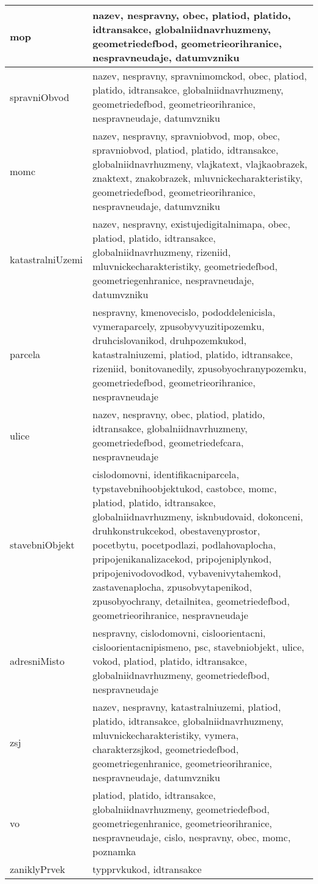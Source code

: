 \begin{center}
\begin{longtable}{|>{\raggedright\arraybackslash}p{4cm}|>{\raggedright\arraybackslash}p{9cm}|}
    \hline
    mop & nazev, nespravny, obec, platiod, platido, idtransakce, globalniidnavrhuzmeny, geometriedefbod, geometrieorihranice, nespravneudaje, datumvzniku \\
    \hline
    spravniObvod & nazev, nespravny, spravnimomckod, obec, platiod, platido, idtransakce, globalniidnavrhuzmeny, geometriedefbod, geometrieorihranice, nespravneudaje, datumvzniku \\
    \hline
    momc & nazev, nespravny, spravniobvod, mop, obec, spravniobvod, platiod, platido, idtransakce, globalniidnavrhuzmeny, vlajkatext, vlajkaobrazek, znaktext, znakobrazek, mluvnickecharakteristiky, geometriedefbod, geometrieorihranice, nespravneudaje, datumvzniku \\
    \hline
    katastralniUzemi & nazev, nespravny, existujedigitalnimapa, obec, platiod, platido, idtransakce, globalniidnavrhuzmeny, rizeniid, mluvnickecharakteristiky, geometriedefbod, geometriegenhranice, nespravneudaje, datumvzniku \\
    \hline
    parcela & nespravny, kmenovecislo, pododdelenicisla, vymeraparcely, zpusobyvyuzitipozemku, druhcislovanikod, druhpozemkukod, katastralniuzemi, platiod, platido, idtransakce, rizeniid, bonitovanedily, zpusobyochranypozemku, geometriedefbod, geometrieorihranice, nespravneudaje \\
    \hline
    ulice & nazev, nespravny, obec, platiod, platido, idtransakce, globalniidnavrhuzmeny, geometriedefbod, geometriedefcara, nespravneudaje \\
    \hline
    stavebniObjekt & cislodomovni, identifikacniparcela, typstavebnihoobjektukod, castobce, momc, platiod, platido, idtransakce, globalniidnavrhuzmeny, isknbudovaid, dokonceni, druhkonstrukcekod, obestavenyprostor, pocetbytu, pocetpodlazi, podlahovaplocha, pripojenikanalizacekod, pripojeniplynkod, pripojenivodovodkod, vybavenivytahemkod, zastavenaplocha, zpusobvytapenikod, zpusobyochrany, detailnitea, geometriedefbod, geometrieorihranice, nespravneudaje \\
    \hline
    adresniMisto & nespravny, cislodomovni, cisloorientacni, cisloorientacnipismeno, psc, stavebniobjekt, ulice, vokod, platiod, platido, idtransakce, globalniidnavrhuzmeny, geometriedefbod, nespravneudaje \\
    \hline
    zsj & nazev, nespravny, katastralniuzemi, platiod, platido, idtransakce, globalniidnavrhuzmeny, mluvnickecharakteristiky, vymera, charakterzsjkod, geometriedefbod, geometriegenhranice, geometrieorihranice, nespravneudaje, datumvzniku \\
    \hline
    vo & platiod, platido, idtransakce, globalniidnavrhuzmeny, geometriedefbod, geometriegenhranice, geometrieorihranice, nespravneudaje, cislo, nespravny, obec, momc, poznamka \\
    \hline
    zaniklyPrvek & typprvkukod, idtransakce \\
    \hline
    
  \end{longtable}
\end{center}

